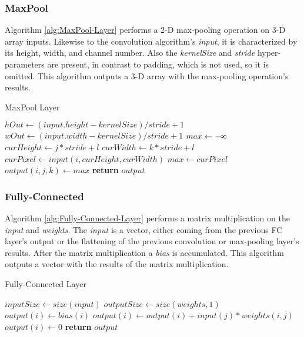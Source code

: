 \subsubsection{MaxPool}
Algorithm \ref{alg:MaxPool-Layer} performs a 2-D max-pooling operation on 3-D array inputs. Likewise to the convolution algorithm's \textit{input}, it is characterized by its height, width, and channel number. Also the \textit{kernelSize} and \textit{stride} hyper-parameters are present, in contrast to padding, which is not used, so it is omitted. This algorithm outputs a 3-D array with the max-pooling operation's results.

\begin{algorithm}[H]
	\caption{MaxPool Layer}\label{alg:MaxPool-Layer}
	\begin{algorithmic}[1]
			\State $hOut \gets (input.height - kernelSize) / stride + 1$
			\State $wOut \gets (input.width - kernelSize) / stride + 1$
						\State $max \gets -\infinity$
								\State $curHeight \gets j * stride + l$
								\State $curWidth \gets k * stride + l$
								\State $curPixel \gets input(i, curHeight, curWidth)$
									\State $max \gets curPixel$
								\EndIf
							\EndFor
						\EndFor
						\State $output(i, j, k) \gets max$
					\EndFor
				\EndFor
			\EndFor
			\State \textbf{return} $output$
		\EndProcedure
	\end{algorithmic}
\end{algorithm}

\subsubsection{Fully-Connected}
Algorithm \ref{alg:Fully-Connected-Layer} performs a matrix multiplication on the \textit{input} and \textit{weights}. The \textit{input} is a vector, either coming from the previous FC layer's output or the flattening of the previous convolution or max-pooling layer's results. After the matrix multiplication a \textit{bias} is accumulated. This algorithm outputs a vector with the results of the matrix multiplication.

\begin{algorithm}[H]
	\caption{Fully-Connected Layer}\label{alg:Fully-Connected-Layer}
	\begin{algorithmic}[1]
			\State $inputSize \gets size(input)$
			\State $outputSize \gets size(weights, 1)$
				\State $output(i)\gets bias(i)$
					\State $output(i)\gets output(i) + input(j) * weights(i, j)$
				\EndFor
					\State $output(i) \gets 0$
				\EndIf
			\EndFor
			\State \textbf{return} $output$
		\EndProcedure
	\end{algorithmic}
\end{algorithm}

